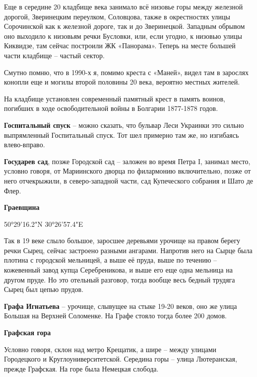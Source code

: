 Еще в середине 20 кладбище века занимало всё низовье горы между железной дорогой, Зверинецким переулком, Соловцова, также в окрестностях улицы Сорочинской как к железной дороге, так и до Зверинецкой. Западным обрывом оно выходило к низовьям речки Бусловки, или, если угодно, к низовью улицы Киквидзе, там сейчас построили ЖК «Панорама». Теперь на месте большей части кладбище – частый сектор.

Смутно помню, что в 1990-х я, помимо креста с «Маней», видел там в зарослях конопли еще и могилы второй половины 20 века, вероятно местных жителей.

На кладбище установлен современный памятный крест в память воинов, погибших в ходе освободительной войны в Болгарии 1877-1878 годов.\\

\medskip

\textbf{Госпитальный спуск} – можно сказать, что бульвар Леси Украинки это сильно выпрямленный Госпитальный спуск. Тот шел примерно там же, но изгибаясь влево-вправо.\\

\medskip

\textbf{Государев сад}, позже Городской сад – заложен во время Петра I, занимал место, условно говоря, от Мариинского дворца по филармонию включительно, позже от него отчекрыжили, в северо-западной части, сад Купеческого собрания и Шато де Флер.\\

\medskip

\textbf{Граевщина} 

50°29'16.2"N 30°26'57.4"E

Так в 19 веке слыло большое, заросшее деревьями урочище на правом берегу речки Сырец, сейчас застроено разными ангарами. Напротив него на Сырце была плотина с городской мельницей, а выше её пруда, выше по течению – кожевенный завод купца Серебреникова, и выше его еще одна мельница на другом пруде. Но это отельный разговор, тогда вообще весь бедный трудяга Сырец был цепью прудов.\\

\medskip

\textbf{Графа Игнатьева} – урочище, слывущее на стыке 19-20 веков, оно же улица Большая на Верхней Соломенке. На Графе стояло тогда более 200 домов.\\

\medskip

\textbf{Графская гора} 

Условно говоря, склон над метро Крещатик, а шире – между улицами Городецкого и Круглоуниверситетской. Середина горы – улица Лютеранская, прежде Графская. На горе была Немецкая слобода.\\

